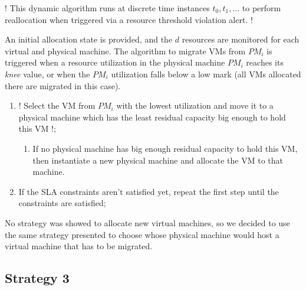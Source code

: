 ! This dynamic algorithm runs at discrete time instances $t_0, t_1, \ldots$  to perform reallocation when triggered via a resource threshold violation alert. !

An initial allocation state is provided, and the $d$ resources are monitored for each virtual and physical machine. The algorithm to migrate VMs from $PM_i$ is triggered when a resource utilization in the physical machine $PM_i$ reaches its \emph{knee} value, or when the $PM_i$ utilization falls below a low mark (all VMs allocated there are migrated in this case).

\begin{enumerate}
	\item ! Select the VM from $PM_i$ with the lowest utilization and move it to a physical machine which has the least residual capacity big enough to hold this VM !;
	\begin{enumerate}
		\item If no physical machine has big enough residual capacity to hold this VM, then instantiate a new physical machine and allocate the VM to that machine.
	\end{enumerate}
	\item If the SLA constraints aren't satisfied yet, repeat the first step until the constraints are satisfied;
\end{enumerate}

No strategy was showed to allocate new virtual machines, so we decided to use the same strategy presented to choose whose physical machine would host a virtual machine that has to be migrated.


\subsection{Strategy 3}
